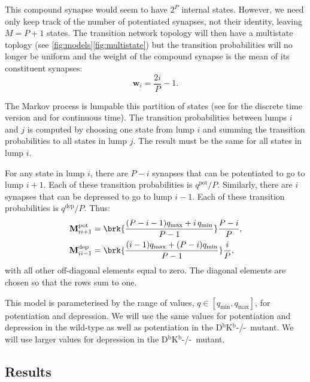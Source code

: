 \documentclass[12pt]{article}
\newcommand{\w}{\mathbf{w}}
\newcommand{\M}{\mathbf{M}}
\newcommand{\pot}{^{\text{pot}}}
\newcommand{\dep}{^{\text{dep}}}
\newcommand{\KO}{D$^\mathrm{b}$K$^\mathrm{b}$-/-}
\newcommand{\lmax}{_{\text{max}}}
\newcommand{\lmin}{_{\text{min}}}
\begin{document}
This compound synapse would seem to have $2^P$ internal states.
However, we need only keep track of the number of potentiated synapses, not their identity, leaving $M=P+1$ states.
The transition network topology will then have a multistate toplogy (see \autoref{fig:models}\ref{fig:multistate}) but the transition probabilities will no longer be uniform and the weight of the compound synapse is the mean of its constituent synapses:
%
\begin{equation}\label{eq:pooledweight}
  \w_i = \frac{2i}{P}-1.
\end{equation}
%


The Markov process is lumpable \wrt this partition of states (see \cite[\S6.3]{kemeny1960finite} for the discrete time version and \cite{burke1958markovian,Ball1993Lumpability} for continuous time).
The transition probabilities between lumps $i$ and $j$ is computed by choosing one state from lump $i$ and summing the transition probabilities to all states in lump $j$.
The result must be the same for all states in lump $i$.

For any state in lump $i$, there are $P-i$ synapses that can be potentiated to go to lump $i+1$.
Each of these transition probabilities is $q\pot/P$.
Similarly, there are $i$ synapses that can be depressed to go to lump $i-1$.
Each of these transition probabilities is $q\dep/P$.
Thus:
%
\begin{equation}\label{eq:pooledpotdep}
  \begin{aligned}
    \M\pot_{ii+1} &=  \brk{\frac{(P-i-1)q\lmax + i\,q\lmin}{P-1}} \frac{P-i}{P}, \\
    \M\dep_{ii-1} &=  \brk{\frac{(i-1)q\lmax + (P-i)q\lmin}{P-1}} \frac{i}{P},
  \end{aligned}
\end{equation}
%
with all other off-diagonal elements equal to zero.
The diagonal elements are chosen so that the rows sum to one.

This model is parameterised by the range of values, $q\in[q\lmin,q\lmax]$, for potentiation and depression.
We will use the same values for potentiation and depression in the wild-type as well as potentiation in the \KO\ mutant.
We will use larger values for depression in the \KO\ mutant.


\subsection{Results}\label{sec:results}
\end{document}
